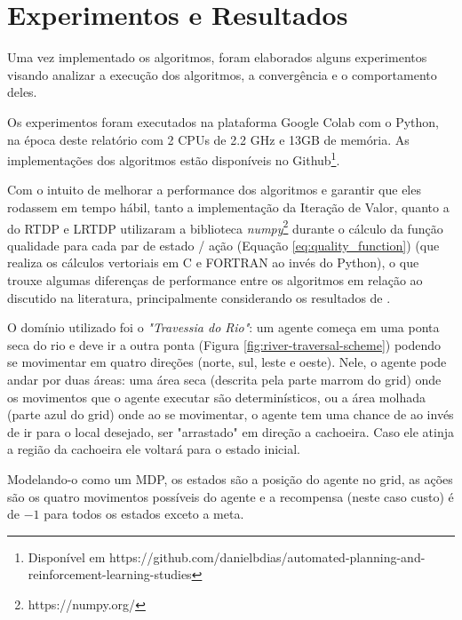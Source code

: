 \documentclass[letterpaper]{article}
\begin{document}


\section{Experimentos e Resultados}

Uma vez implementado os algoritmos, foram elaborados alguns experimentos visando analizar a execução dos algoritmos, a convergência e o comportamento deles.

Os experimentos foram executados na plataforma Google Colab com o Python, na época deste relatório com 2 CPUs de 2.2 GHz e 13GB de memória. As implementações dos algoritmos estão disponíveis no Github\footnote{Disponível em https://github.com/danielbdias/automated-planning-and-reinforcement-learning-studies}.

Com o intuito de melhorar a performance dos algoritmos e garantir que eles rodassem em tempo hábil, tanto a implementação da Iteração de Valor, quanto a do RTDP e LRTDP utilizaram a biblioteca \emph{numpy}\footnote{https://numpy.org/} durante o cálculo da função qualidade para cada par de estado / ação (Equação \ref{eq:quality_function}) (que realiza os cálculos vertoriais em C e FORTRAN ao invés do Python), o que trouxe algumas diferenças de performance entre os algoritmos em relação ao discutido na literatura, principalmente considerando os resultados de \cite{BonetGeffer-2003}.

O domínio utilizado foi o \emph{"Travessia do Rio"}: um agente começa em uma ponta seca do rio e deve ir a outra ponta (Figura \ref{fig:river-traversal-scheme}) podendo se movimentar em quatro direções (norte, sul, leste e oeste). Nele, o agente pode andar por duas áreas: uma área seca (descrita pela parte marrom do grid) onde os movimentos que o agente executar são determinísticos, ou a área molhada (parte azul do grid) onde ao se movimentar, o agente tem uma chance de ao invés de ir para o local desejado, ser "arrastado" em direção a cachoeira. Caso ele atinja a região da cachoeira ele voltará para o estado inicial.

Modelando-o como um MDP, os estados são a posição do agente no grid, as ações são os quatro movimentos possíveis do agente e a recompensa (neste caso custo) é de $-1$ para todos os estados exceto a meta.
\end{document}
